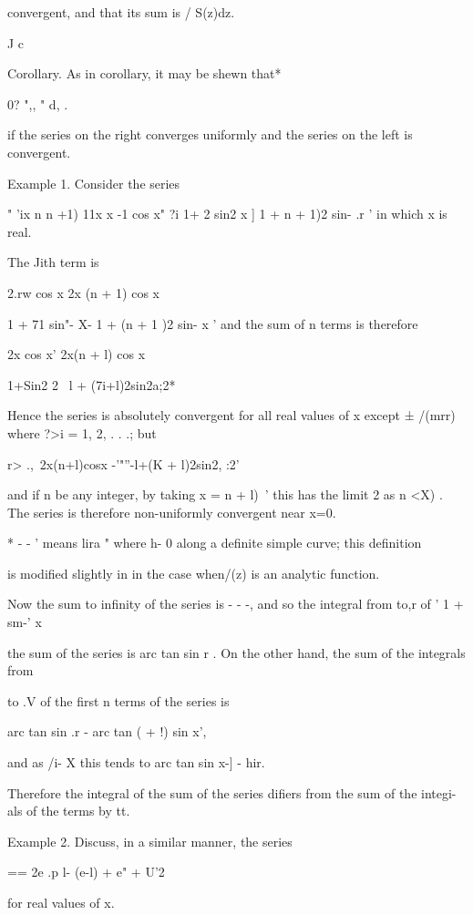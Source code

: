 convergent, and that its sum is / S(z)dz.

J c

Corollary. As in corollary, it may be shewn that*

0? ",, " d, .

if the series on the right converges uniformly and the series on the
left is convergent.

Example 1. Consider the series

" 'ix n n +1) 11x x -1 cos x" ?i 1+ 2 sin2 x ] 1 + n + 1)2 sin- .r '
in which x is real.

The Jith term is

2.rw cos x 2x (n + 1) cos x

1 + 71 sin"- X- 1 + (n + 1 )2 sin- x ' and the sum of n terms is
therefore

2x cos x' 2x(n + l) cos x

1+Sin2 2~ l + (7i+l)2sin2a;2*

Hence the series is absolutely convergent for all real values of x
except ± /(mrr) where ?>i = 1, 2, . . .; but

r> .,\ 2x(n+l)cosx -'"''-l+(K + l)2sin2, :2'

and if n be any integer, by taking x = n + l)~' this has the limit 2
as n <X) . The series is therefore non-uniformly convergent near x=0.

* - - ' means lira " where h- 0 along a definite simple curve; this
definition

is modified slightly in in the case when/(z) is an analytic
function.

%
%

Now the sum to infinity of the series is - - -, and so the integral
from to,r of ' 1 + sm-' x

the sum of the series is arc tan sin r . On the other hand, the sum of
the integrals from

to .V of the first n terms of the series is

arc tan sin .r - arc tan ( + !) sin x',

and as /i- X this tends to arc tan sin x-] - hir.

Therefore the integral of the sum of the series difiers from the sum
of the integi-als of the terms by tt.

Example 2. Discuss, in a similar manner, the series

== 2e .p l- (e-l) + e" + U'2

for real values of x.

